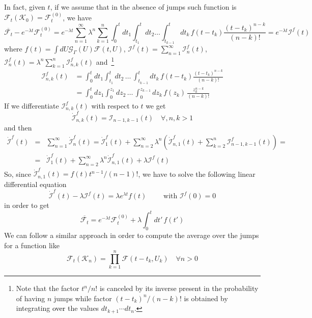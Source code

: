 \documentclass[12pt]{iopart}
\newcommand{\lx} {\left}
\newcommand{\rx} {\right}
\newcommand{\cG} {\mathcal{G}}
\newcommand{\cI} {\mathcal{I}}
\newcommand{\cK} {\mathcal{K}}
\newcommand{\cF} {\mathcal{F}}
\begin{document}
In fact, given $t$, if we assume that in the absence of jumps such function is $\cF_t(\cK_0)=\cF^{(0)}_t$, we have
\begin{equation}
    \overline{\cF_t} - e^{-\lambda t}\cF^{(0)}_t = e^{-\lambda t} \sum_{n=1}^\infty \lambda^n \sum_{k=1}^n \int_0^t d t_1 \int_{t_1}^t d t_2 \dots \int_{t_{k-1}}^t d t_k\, f(t-t_k) \frac{(t-t_k)^{n-k}}{(n-k)!}
    = e^{-\lambda t} \cI^f(t)
\end{equation}
where $f(t) = \int dU \cG_{\Gamma}(U) \cF(t,U)$, $\cI^f(t) = \sum_{n=1}^\infty \cI^f_n(t)$, $\cI^f_n(t) = \lambda^n \sum_{k=1}^n \cI^f_{n,k}(t)$ and~\footnote{Note that the factor $t^n/n!$ is canceled by its inverse present in the probability of having $n$ jumps while factor $(t-t_k)^n/(n-k)!$ is obtained by integrating \textcolor{black}{over} the values $dt_{k+1}\cdots dt_n$.}
\begin{align}
    \cI^f_{n,k}(t) &= \int_0^t d t_1 \int_{t_1}^t d t_2 \, \dots \, \int_{t_{k-1}}^t d t_k \, f(t-t_k) \frac{(t-t_k)^{n-k}}{(n-k)!} \nonumber\\ 
    &= \int_0^t d z_1 \int_0^{z_1} d z_2 \, \dots \, \int_0^{z_{k-1}} d z_k \, f(z_k) \, \frac{z_k^{n-k}}{(n-k)!} 
\end{align}
If we differentiate $\cI^f_{n,k}(t)$ with respect to $t$ we get
\begin{equation}
\dot{\cI}^f_{n,k}(t)=\cI_{n-1,k-1}(t) \quad \forall, n,k>1
\end{equation}
and then
\begin{eqnarray}
    \dot{\cI}^f(t) &=& \sum_{n=1}^\infty \dot{\cI}^f_n(t) =  \dot{\cI}^f_1(t) + \sum_{n=2}^\infty \lambda^n \lx(\dot{\cI}^f_{n,1}(t) + \sum_{k=2}^n \cI^f_{n-1,k-1}(t)\rx) = \nonumber\\
    &=& \dot{\cI}^f_1(t) + \sum_{n=2}^\infty \lambda^n \dot{\cI}^f_{n,1}(t) + \lambda \cI^f(t) 
\end{eqnarray}
So, since $\dot{\cI}^f_{n,1}(t) = f(t) t^{n-1}/(n-1)!$, we have to solve the following linear differential equation
\begin{equation}
    \dot{\cI}^f(t) -\lambda \cI^f(t) = \lambda e^{\lambda t} f(t) \qquad \text { with } \cI^f(0) = 0
\end{equation}
in order to get
\begin{equation}
\overline{\cF_t} = e^{-\lambda t}\cF^{(0)}_t + \lambda \int_0^t dt'\, f(t')
\label{avejumpsum}
\end{equation}
We can follow a similar approach in order to compute the average over the jumps for a function like
\begin{equation}
    \cF_t(\cK_n) = \prod_{k=1}^n \cF(t-t_k, U_k) \quad \forall n > 0
\end{equation}
\end{document}
